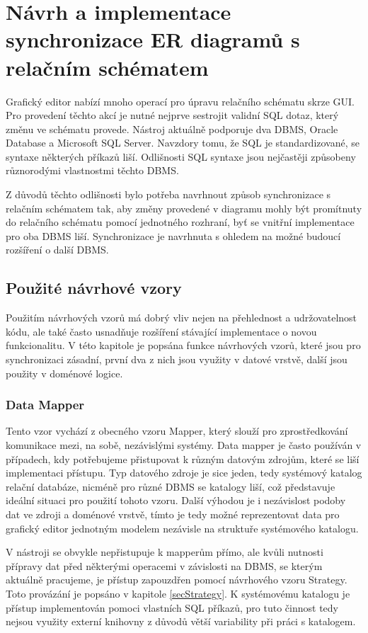\documentclass[czech,bachelor,public,dept460,male,oneside]{diploma}
\begin{document}
\newpage
\section{Návrh a implementace synchronizace ER diagramů s relačním schématem}
Grafický editor nabízí mnoho operací pro úpravu relačního schématu skrze GUI. Pro provedení těchto akcí je nutné nejprve sestrojit validní SQL dotaz, který změnu ve schématu provede. Nástroj aktuálně podporuje dva DBMS, Oracle Database a Microsoft SQL Server. Navzdory tomu, že SQL je standardizované, se syntaxe některých příkazů liší. Odlišnosti SQL syntaxe jsou nejčastěji způsobeny různorodými vlastnostmi těchto DBMS. 

Z důvodů těchto odlišnosti bylo potřeba navrhnout způsob synchronizace s relačním schématem tak, aby změny provedené v diagramu mohly být promítnuty do relačního schématu pomocí jednotného rozhraní, byť se vnitřní implementace pro oba DBMS liší. Synchronizace je navrhnuta s ohledem na možné budoucí rozšíření o další DBMS.
	
	\subsection{Použité návrhové vzory}
	Použitím návrhových vzorů má dobrý vliv nejen na přehlednost a udržovatelnost kódu, ale také často usnadňuje rozšíření stávající implementace o novou funkcionalitu.  V této kapitole je popsána funkce návrhových vzorů, které jsou pro synchronizaci zásadní, první dva z nich jsou využity v datové vrstvě, další jsou použity v doménové logice.
	
		\subsubsection{Data Mapper}
		Tento vzor vychází z obecného vzoru Mapper, který slouží pro zprostředkování komunikace mezi, na sobě, nezávislými systémy. Data mapper je často používán v případech, kdy potřebujeme přistupovat k různým datovým zdrojům, které se liší implementaci přístupu. Typ datového zdroje je sice jeden, tedy systémový katalog relační databáze, nicméně pro různé DBMS se katalogy liší, což představuje ideální situaci pro použití tohoto vzoru. Další výhodou je i nezávislost podoby dat ve zdroji a doménové vrstvě, tímto je tedy možné reprezentovat data pro grafický editor jednotným modelem nezávisle na struktuře systémového katalogu.
		
		V nástroji se obvykle nepřistupuje k mapperům přímo, ale kvůli nutnosti přípravy dat před některými operacemi v závislosti na DBMS, se kterým aktuálně pracujeme, je přístup zapouzdřen pomocí návrhového vzoru Strategy. Toto provázání je popsáno v kapitole \ref{secStrategy}. K systémovému katalogu je přístup implementován pomoci vlastních SQL příkazů, pro tuto činnost tedy nejsou využity externí knihovny z důvodů větší variability při práci s katalogem.
		
\end{document}
